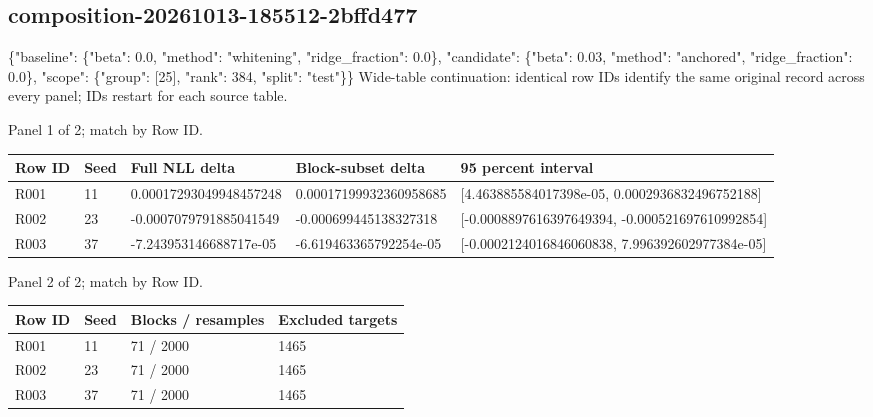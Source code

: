\documentclass[10pt]{article}
\begin{document}
\subsection{composition-20261013-185512-2bffd477}
\{"baseline": \{"beta": 0.0, "method": "whitening", "ridge\_fraction": 0.0\}, "candidate": \{"beta": 0.03, "method": "anchored", "ridge\_fraction": 0.0\}, "scope": \{"group": [25], "rank": 384, "split": "test"\}\}
Wide-table continuation: identical row IDs identify the same original record across every panel; IDs restart for each source table.
\par\noindent Panel 1 of 2; match by Row ID.
{\scriptsize\setlength{\tabcolsep}{2pt}
\begin{longtable}{p{}p{}p{}p{}p{}}
Row ID & Seed & Full NLL delta & Block-subset delta & 95 percent interval \\
\hline\endhead
R001 & 11 & 0.00017293049948457248 & 0.00017199932360958685 & [4.463885584017398e-05, 0.0002936832496752188] \\
R002 & 23 & -0.0007079791885041549 & -0.000699445138327318 & [-0.0008897616397649394, -0.000521697610992854] \\
R003 & 37 & -7.243953146688717e-05 & -6.619463365792254e-05 & [-0.0002124016846060838, 7.996392602977384e-05] \\
\end{longtable}}
\par\noindent Panel 2 of 2; match by Row ID.
{\scriptsize\setlength{\tabcolsep}{2pt}
\begin{longtable}{p{}p{}p{}p{}}
Row ID & Seed & Blocks / resamples & Excluded targets \\
\hline\endhead
R001 & 11 & 71 / 2000 & 1465 \\
R002 & 23 & 71 / 2000 & 1465 \\
R003 & 37 & 71 / 2000 & 1465 \\
\end{longtable}}
\end{document}
